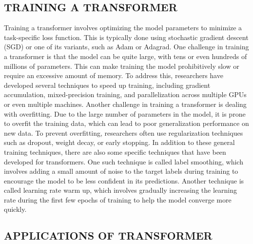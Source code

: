 \documentclass[letterpaper, 10pt, conference]{ieeeconf}
\begin{document}
    
    
    \subsection{TRAINING A TRANSFORMER}
    
    Training a transformer involves optimizing the model parameters to minimize a task-specific loss function. This is typically done
    using stochastic gradient descent (SGD) or one of its variants, such as Adam or Adagrad.
    One challenge in training a transformer is that the model can be quite large, with tens or even hundreds of millions of
    parameters. This can make training the model prohibitively slow or require an excessive amount of memory. To address this,
    researchers have developed several techniques to speed up training, including gradient accumulation, mixed-precision training, and
    parallelization across multiple GPUs or even multiple machines.
    Another challenge in training a transformer is dealing with overfitting. Due to the large number of parameters in the
    model, it is prone to overfit the training data, which can lead to poor generalization performance on new data. To prevent
    overfitting, researchers often use regularization techniques such as dropout, weight decay, or early stopping.
    In addition to these general training techniques, there are also some specific techniques that have been developed for
    transformers. One such technique is called label smoothing, which involves adding a small amount of noise to the target labels
    during training to encourage the model to be less confident in its predictions. Another technique is called learning rate warm up,
    which involves gradually increasing the learning rate during the first few epochs of training to help the model converge more
    quickly.
    
    
    \subsection{APPLICATIONS OF TRANSFORMER}
    
\end{document}
